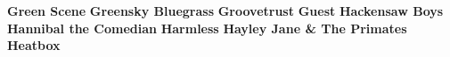 \vspace{10pt} 
\newline
\vspace{10pt} 
\noindent \textbf{Green Scene}\newline
\vspace{10pt} 
\newline
\vspace{10pt} 
\noindent \textbf{Greensky Bluegrass}\newline
\vspace{10pt} 
\newline
\vspace{10pt} 
\noindent \textbf{Groovetrust}\newline
\vspace{10pt} 
\newline
\vspace{10pt} 
\noindent \textbf{Guest}\newline
\vspace{10pt} 
\newline
\vspace{10pt} 
\noindent \textbf{Hackensaw Boys}\newline
\vspace{10pt} 
\newline
\vspace{10pt} 
\noindent \textbf{Hannibal the Comedian}\newline
\vspace{10pt} 
\newline
\vspace{10pt} 
\noindent \textbf{Harmless}\newline
\vspace{10pt} 
\newline
\vspace{10pt} 
\noindent \textbf{Hayley Jane \& The Primates}\newline
\vspace{10pt} 
\newline
\vspace{10pt} 
\noindent \textbf{Heatbox}\newline
\vspace{10pt} 
\newline

